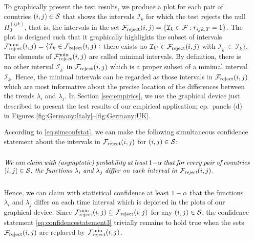 \documentclass[a4paper,12pt]{article}
\numberwithin{equation}{section}
\begin{document}
To graphically present the test results, we produce a plot for each pair of countries $(i,j) \in \mathcal{S}$ that shows the intervals $\mathcal{I}_k$ for which the test rejects the null $H_0^{(ijk)}$, that is, the intervals in the set $\mathcal{F}_{\text{reject}}(i,j) = \{ \mathcal{I}_k \in \mathcal{F}: r_{ijk,T} = 1 \}$. The plot is designed such that it graphically highlights the subset of intervals $\mathcal{F}_{\text{reject}}^{\text{min}}(i,j) = \{ \mathcal{I}_k \in \mathcal{F}_{\text{reject}}(i,j):$ there exists no $\mathcal{I}_{k^\prime} \in \mathcal{F}_{\text{reject}}(i,j)$ with $\mathcal{I}_{k^\prime} \subset \mathcal{I}_k \}$. The elements of $\mathcal{F}_{\text{reject}}^{\text{min}}(i,j)$ are called minimal intervals. By definition, there is no other interval $\mathcal{I}_{k^\prime}$ in $\mathcal{F}_{\text{reject}}(i,j)$ which is a proper subset of a minimal interval $\mathcal{I}_k$. Hence, the minimal intervals can be regarded as those intervals in $\mathcal{F}_{\text{reject}}(i,j)$ which are most informative about the precise location of the differences between the trends $\lambda_i$ and $\lambda_j$. In Section \ref{sec:empirics}, we use the graphical device just described to present the test results of our empirical application; cp.\ panels (d) in Figures \ref{fig:Germany:Italy}--\ref{fig:Germany:UK}.  


According to \eqref{eq:simconfstat}, we can make the following simultaneous confidence statement about the intervals in $\mathcal{F}_{\text{reject}}(i,j)$ for $(i,j) \in \mathcal{S}$: 
\begin{equation}\label{eq:confidencestatement3}
\begin{minipage}[c][1.75cm][c]{13cm}
\textit{We can claim with (asymptotic) probability at least $1-\alpha$ that for every pair of countries $(i,j) \in \pairs$, the functions $\lambda_i$ and $\lambda_j$ differ on each interval in $\intervals_{\text{reject}}(i,j)$.} 
\end{minipage}
\end{equation}
Hence, we can claim with statistical confidence at least $1-\alpha$ that the functions $\lambda_i$ and $\lambda_j$ differ on each time interval which is depicted in the plots of our graphical device. Since $\mathcal{F}_{\text{reject}}^{\text{min}}(i,j) \subseteq \mathcal{F}_{\text{reject}}(i,j)$ for any $(i,j) \in \mathcal{S}$, the confidence statement \eqref{eq:confidencestatement3} trivially remains to hold true when the sets $\mathcal{F}_{\text{reject}}(i,j)$ are replaced by $\mathcal{F}_{\text{reject}}^{\text{min}}(i,j)$.
\end{document}

